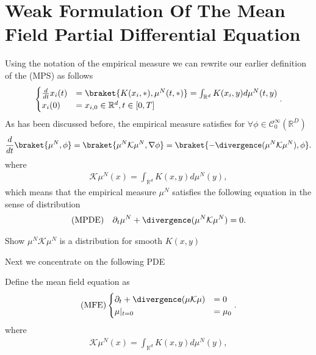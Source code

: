 \section{Weak Formulation Of The Mean Field Partial Differential Equation}
Using the notation of the empirical measure we can rewrite our earlier definition of the (MPS) as follows
\begin{align*}
  \begin{cases}
    \frac{d}{dt} x_i(t) &= \braket{K(x_i,*),\mu^N(t,*)} = \int_{\mathbb{R}^{d} } K(x_{i},y) d\mu ^{N} (t,y)\\
    x_i(0)&=x_{i,0} \in \mathbb{R}^{d} , t \in [0,T]
  \end{cases}
.\end{align*}
As has been discussed before, the empirical measure satisfies for $\forall  \phi  \in \mathcal{C}_0^{\infty}(\mathbb{R}^{D} ) $ 
\begin{align*}
  \frac{d}{dt} \braket{\mu ^{N},\phi  } = \braket{\mu ^{N}\mathcal{K}\mu ^{N},\nabla \phi   } = \braket{- \divergence(\mu^N \mathcal{K} \mu ^{N} ),\phi }
.\end{align*}
where 
\begin{align*}
  \mathcal{K}\mu ^{N}(x) = \int_{\mathbb{R}^{d} }  K(x,y) d\mu ^{N} (y)
,\end{align*}
which means that the empirical measure $\mu ^{N} $ satisfies the following equation in the 
sense of distribution 
\begin{align*}
  \text{(MPDE)} \quad \partial_t \mu ^{N}  + \divergence(\mu ^{N}\mathcal{K}\mu ^{N}  ) = 0
.\end{align*}
\begin{exercise}
 Show $\mu ^{N}\mathcal{K}\mu ^{N}  $  is a distribution for smooth $K(x,y)$ 
\end{exercise}
Next we concentrate on the following PDE 
\begin{definition}\label{mfe}
 Define the mean field equation as 
 \begin{align*}
  \text{(MFE)}\begin{cases}
    \partial_t + \divergence (\mu \mathcal{K}\mu ) &= 0\\
    \mu \rvert_{t=0} &= \mu_0
  \end{cases}
 .\end{align*}
 where
\begin{align*}
  \mathcal{K}\mu ^{N}(x) = \int_{\mathbb{R}^{d} }  K(x,y) d\mu ^{N} (y)
,\end{align*}
\end{definition}

